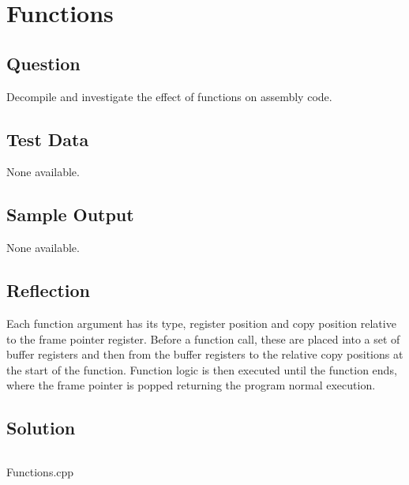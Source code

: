 \documentclass[Lab-C.tex]{subfiles}
\begin{document}
    \section{Functions}
        \subsection{Question}
            Decompile and investigate the effect of functions on assembly code.
            
        \subsection{Test Data}
            None available.
        
        \subsection{Sample Output}
            None available.

        \subsection{Reflection}
            Each function argument has its type, register position and copy position relative to the frame pointer register.
            Before a function call, these are placed into a set of buffer registers and then from the buffer registers
            to the relative copy positions at the start of the function. 
            Function logic is then executed until the function ends, where the frame pointer is popped
            returning the program normal execution.
        
        \subsection{Solution}
            \begin{listing}[H]
                \inputminted[firstline=4, lastline=29]{cpp}{../Tasks/03-Functions/Functions.cpp}%
                \caption{Functions.cpp}
            \end{listing}
\end{document}
